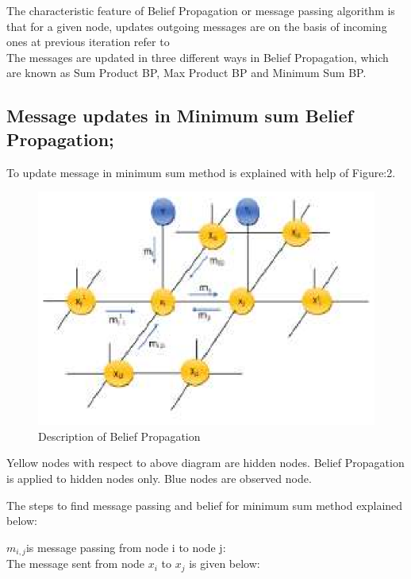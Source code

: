 \documentclass{singlecol-new}
\theoremstyle{TH}{
\newtheorem{lemma}{Lemma}
\newtheorem{theorem}[lemma]{Theorem}
\newtheorem{corrolary}[lemma]{Corrolary}
\newtheorem{conjecture}[lemma]{Conjecture}
\newtheorem{proposition}[lemma]{Proposition}
\newtheorem{claim}[lemma]{Claim}
\newtheorem{stheorem}[lemma]{Wrong Theorem}
\newtheorem{algorithm}{Algorithm}
}
\theoremstyle{THrm}{
\newtheorem{definition}{Definition}[section]
\newtheorem{question}{Question}[section]
\newtheorem{remark}{Remark}
\newtheorem{scheme}{Scheme}
}
\theoremstyle{THhit}{
\newtheorem{case}{Case}[section]
}
\begin{document}
The characteristic feature of Belief Propagation or message passing algorithm is that for a given node,  updates outgoing messages are on the basis of incoming ones at previous iteration   refer to \cite{Mezard}\\
The messages are updated in three different ways in Belief Propagation, which are known as Sum Product BP, Max Product BP and Minimum Sum BP.



\subsection{Message updates in Minimum sum Belief Propagation;}




To update message in minimum sum method is explained with help of Figure:2.

\begin{figure}[t]%
\includegraphics{bp.eps}
\caption{Description of Belief Propagation}\label{fig:editpublish}
\end{figure}
Yellow nodes with respect to above diagram are hidden nodes. Belief Propagation is applied to hidden nodes only.  Blue nodes are observed node.






The steps to find message passing  and belief for                 minimum sum method explained below:

$m_{i,j}$is  message passing from node i to node j: \\The message sent from node $ x_{i}$  to $x_{j}$ is given below:
\end{document}

